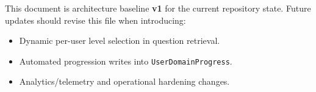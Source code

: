 \documentclass[11pt]{article}
\begin{document}
This document is architecture baseline \textbf{v1} for the current repository state.
Future updates should revise this file when introducing:

\begin{itemize}[leftmargin=*]
	\item Dynamic per-user level selection in question retrieval.
	\item Automated progression writes into \texttt{UserDomainProgress}.
	\item Analytics/telemetry and operational hardening changes.
\end{itemize}
\end{document}
